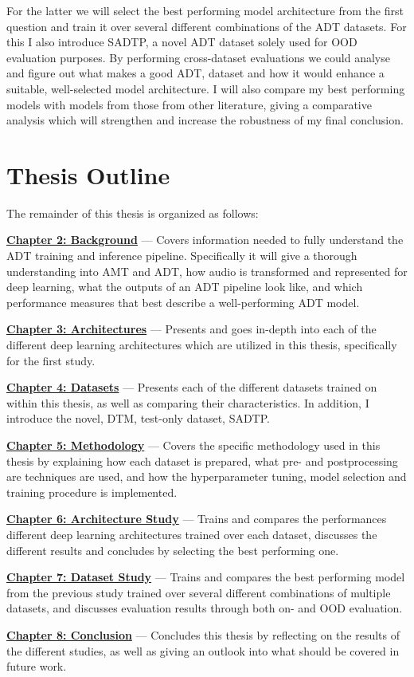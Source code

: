 For the latter we will select the best performing model architecture from the first question and train it over several different combinations of the \gls{ADT} datasets. For this I also introduce SADTP, a novel \gls{ADT} dataset solely used for \gls{OOD} evaluation purposes. By performing cross-dataset evaluations we could analyse and figure out what makes a good \gls{ADT}, dataset and how it would enhance a suitable, well-selected model architecture. I will also compare my best performing models with models from those from other literature, giving a comparative analysis which will strengthen and increase the robustness of my final conclusion.

\section{Thesis Outline}

The remainder of this thesis is organized as follows:

\noindent \hyperref[Background]{\textbf{Chapter 2: Background}} — Covers information needed to fully understand the \gls{ADT} training and inference pipeline. Specifically it will give a thorough understanding into \gls{AMT} and \gls{ADT}, how audio is transformed and represented for deep learning, what the outputs of an \gls{ADT} pipeline look like, and which performance measures that best describe a well-performing \gls{ADT} model.

\noindent \hyperref[Architectures]{\textbf{Chapter 3: Architectures}} — Presents and goes in-depth into each of the different deep learning architectures which are utilized in this thesis, specifically for the first study. 

\noindent \hyperref[Datasets]{\textbf{Chapter 4: Datasets}} — Presents each of the different datasets trained on within this thesis, as well as comparing their characteristics. In addition, I introduce the novel, \gls{DTM}, test-only dataset, SADTP.

\noindent \hyperref[Methodology]{\textbf{Chapter 5: Methodology}} — Covers the specific methodology used in this thesis by explaining how each dataset is prepared, what pre- and postprocessing are techniques are used, and how the hyperparameter tuning, model selection and training procedure is implemented.

\noindent \hyperref[Study1]{\textbf{Chapter 6: Architecture Study}} — Trains and compares the performances different deep learning architectures trained over each dataset, discusses the different results and concludes by selecting the best performing one.

\noindent \hyperref[Study2]{\textbf{Chapter 7: Dataset Study}} — Trains and compares the best performing model from the previous study trained over several different combinations of multiple datasets, and discusses evaluation results through both on- and \gls{OOD} evaluation.

\noindent \hyperref[Conclusion]{\textbf{Chapter 8: Conclusion}} — Concludes this thesis by reflecting on the results of the different studies, as well as giving an outlook into what should be covered in future work.